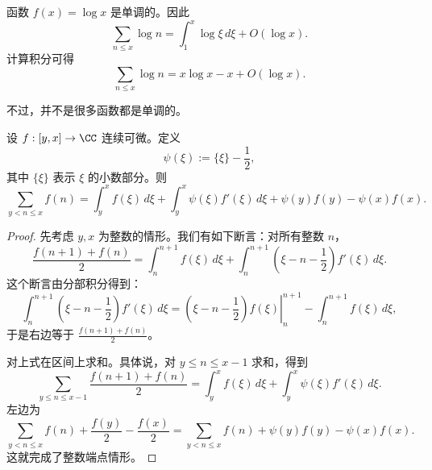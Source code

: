 \begin{example}
	函数 $f(x)=\log x$ 是单调的。因此
	\[
		\sum_{n\leq x}\log n
		=
		\int_1^x\log \xi\,d\xi+O(\log x).
	\]
	计算积分可得
	\[
		\sum_{n\leq x}\log n
		=
		x\log x-x+O(\log x).
	\]
\end{example}

不过，并不是很多函数都是单调的。

\begin{theorem}
	设 $f:[y,x]\to\CC$ 连续可微。定义
	\[
		\psi(\xi):=\{\xi\}-\frac12,
	\]
	其中 $\{\xi\}$ 表示 $\xi$ 的小数部分。则
	\[
		\sum_{y<n\leq x} f(n)
		=
		\int_y^x f(\xi)\,d\xi
		+
		\int_y^x \psi(\xi)f'(\xi)\,d\xi
		+
		\psi(y)f(y)-\psi(x)f(x).
	\]
\end{theorem}

\begin{proof}
	先考虑 $y,x$ 为整数的情形。我们有如下断言：对所有整数 $n$，
	\[
		\frac{f(n+1)+f(n)}{2}
		=
		\int_n^{n+1} f(\xi)\,d\xi
		+
		\int_n^{n+1}\left(\xi-n-\frac12\right)f'(\xi)\,d\xi.
	\]
	这个断言由分部积分得到：
	\[
		\int_n^{n+1}\left(\xi-n-\frac12\right)f'(\xi)\,d\xi
		=
		\left.\left(\xi-n-\frac12\right)f(\xi)\right|_n^{n+1}
		-
		\int_n^{n+1}f(\xi)\,d\xi,
	\]
	于是右边等于 $\frac{f(n+1)+f(n)}2$。

	对上式在区间上求和。具体说，对 $y\leq n\leq x-1$ 求和，得到
	\[
		\sum_{y\leq n\leq x-1}\frac{f(n+1)+f(n)}2
		=
		\int_y^x f(\xi)\,d\xi
		+
		\int_y^x\psi(\xi)f'(\xi)\,d\xi.
	\]
	左边为
	\[
		\sum_{y<n\leq x}f(n)+\frac{f(y)}2-\frac{f(x)}2
		=
		\sum_{y<n\leq x}f(n)+\psi(y)f(y)-\psi(x)f(x).
	\]
	这就完成了整数端点情形。


\end{proof}
